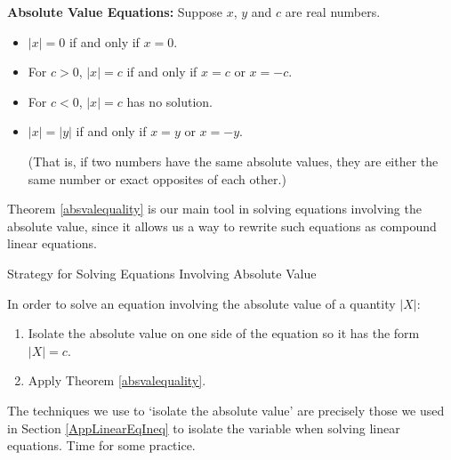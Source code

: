 \begin{tcolorbox}
    
\begin{thm} \textbf{Absolute Value Equations: }\label{absvalequality}  Suppose $x$, $y$ and $c$ are real numbers.

\begin{itemize}

\item  $|x| = 0$ if and only if $x = 0$.

\item  For $c > 0$, $|x| = c$ if and only if $x = c$ or $x = -c$.

\item  For $c < 0$, $|x| = c$ has no solution.

\item  $|x| = |y|$ if and only if $x = y$ or $x = -y$. 

(That is,  if two numbers have the same absolute values, they are either the same number or exact opposites of each other.) 

\end{itemize}

\end{thm}

\end{tcolorbox}

Theorem \ref{absvalequality} is our main tool in solving equations involving the absolute value, since it allows us a way to rewrite such equations as compound linear equations.

\begin{floatbox}[label=box:strategyforsolvingabseqns]{Strategy for Solving Equations Involving Absolute Value}

In order to solve an equation involving the absolute value of a quantity $|X|$:

\begin{enumerate}

\item  Isolate the absolute value on one side of the equation so it has the form $|X| = c$.

\item  Apply Theorem \ref{absvalequality}.

\end{enumerate}

\end{floatbox}

\smallskip

The techniques we use to `isolate the absolute value' are precisely those we used in Section \ref{AppLinearEqIneq} to isolate the variable when solving linear equations.  Time for some practice.


